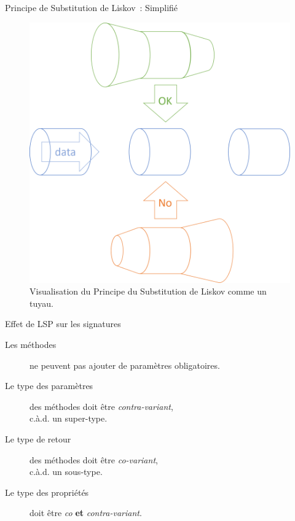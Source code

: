 \documentclass[10pt]{beamer}
\begin{document}
\begin{frame}{Principe de Substitution de Liskov~: Simplifié}
    \begin{figure}
    \includegraphics{lsp-pipes.png}
    \caption{
        Visualisation du Principe du Substitution de Liskov comme un tuyau. \cite{seemann_liskov_2021}
    }
  \end{figure}
\end{frame}
\begin{frame}{Effet de LSP sur les signatures}
    \begin{description}
        \item[Les méthodes] ne peuvent pas ajouter de paramètres obligatoires.
        \item[Le type des paramètres] des méthodes doit être \emph{contra-variant},\\c.à.d. un super-type.
        \item[Le type de retour] des méthodes doit être \emph{co-variant},\\c.à.d. un sous-type.
        \item[Le type des propriétés] doit être \emph{co} \textbf{et} \emph{contra-variant}.
    \end{description}
\end{frame}
\end{document}
